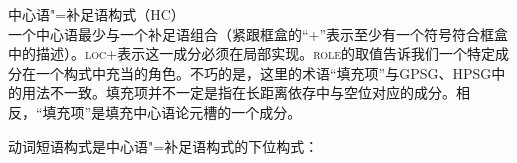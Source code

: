 \ea
中心语"=补足语构式（HC）\\
\setlength{\fboxsep}{2mm}
\z
一个中心语最少与一个补足语组合（紧跟框盒的“+”表示至少有一个符号符合框盒中的描述）。\textsc{loc}+表示这一成分必须在局部实现。\textsc{role}的取值告诉我们一个特定成分在一个构式中充当的角色。不巧的是，这里的术语“填充项”与GPSG、HPSG中的用法不一致。填充项并不一定是指在长距离依存中与空位对应的成分。相反，“填充项”是填充中心语论元槽的一个成分。

动词短语构式是中心语"=补足语构式的下位构式：
 
